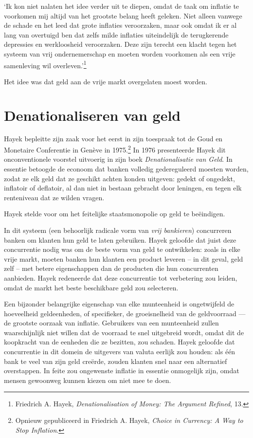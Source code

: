 \documentclass[
  a5paper,
  smalldemyvopaper,11pt,twoside,onecolumn,openright,extrafontsizes,
hidelinks]{memoir}
\renewenvironment{quote}%
               {\list{}{\rightmargin=.3cm\leftmargin=.3cm}%
                \itshape \item[]}%
               {\endlist}
\begin{document}
\begin{quote}
`Ik kon niet nalaten het idee verder uit te diepen, omdat de taak om
inflatie te voorkomen mij altijd van het grootste belang heeft geleken.
Niet alleen vanwege de schade en het leed dat grote inflaties
veroorzaken, maar ook omdat ik er al lang van overtuigd ben dat zelfs
milde inflaties uiteindelijk de terugkerende depressies en werkloosheid
veroorzaken. Deze zijn terecht een klacht tegen het systeem van vrij
ondernemerschap en moeten worden voorkomen als een vrije samenleving wil
overleven.'\footnote{\hspace{0pt}Friedrich A. Hayek,
  \emph{Denationalisation of Money: The Argument Refined}, 13.}
\end{quote}

Het idee was dat geld aan de vrije markt overgelaten moest worden.

\section{Denationaliseren van geld}\label{denationaliseren-van-geld}

Hayek bepleitte zijn zaak voor het eerst in zijn toespraak tot de Goud
en Monetaire Conferentie in Genève in 1975.\footnote{Opnieuw
  gepubliceerd in Friedrich A. Hayek, \emph{Choice in Currency: A Way to
  Stop Inflation}.} In 1976 presenteerde Hayek dit onconventionele
voorstel uitvoerig in zijn boek \emph{Denationalisatie van Geld}. In
essentie betoogde de econoom dat banken volledig gedereguleerd moesten
worden, zodat ze elk geld dat ze geschikt achten konden uitgeven: gedekt
of ongedekt, inflatoir of deflatoir, al dan niet in bestaan gebracht
door leningen, en tegen elk renteniveau dat ze wilden vragen.

Hayek stelde voor om het feitelijke staatsmonopolie op geld te
beëindigen.

In dit systeem (een behoorlijk radicale vorm van \emph{vrij bankieren})
concurreren banken om klanten hun geld te laten gebruiken. Hayek
geloofde dat juist deze concurrentie nodig was om de beste vorm van geld
te ontwikkelen: zoals in elke vrije markt, moeten banken hun klanten een
product leveren -- in dit geval, geld zelf -- met betere eigenschappen
dan de producten die hun concurrenten aanbieden. Hayek redeneerde dat
deze concurrentie tot verbetering zou leiden, omdat de markt het beste
beschikbare geld zou selecteren.

Een bijzonder belangrijke eigenschap van elke munteenheid is
ongetwijfeld de hoeveelheid geldeenheden, of specifieker, de
groeisnelheid van de geldvoorraad --- de grootste oorzaak van inflatie.
Gebruikers van een munteenheid zullen waarschijnlijk niet willen dat de
voorraad te snel uitgebreid wordt, omdat dit de koopkracht van de
eenheden die ze bezitten, zou schaden. Hayek geloofde dat concurrentie
in dit domein de uitgevers van valuta eerlijk zou houden: als één bank
te veel van zijn geld creërde, zouden klanten snel naar een alternatief
overstappen. In feite zou ongewenste inflatie in essentie onmogelijk
zijn, omdat mensen gewoonweg kunnen kiezen om niet mee te doen.
\end{document}
